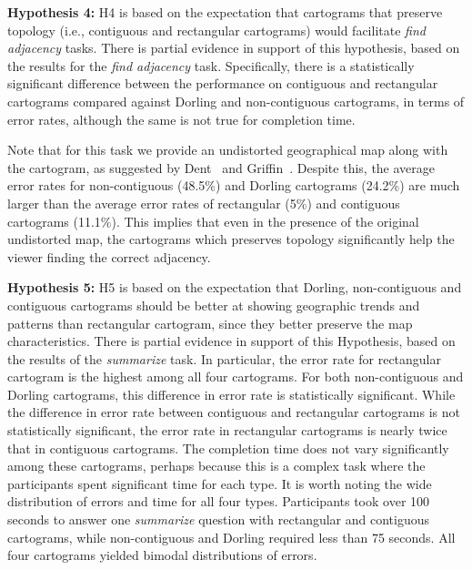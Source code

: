 \documentclass[10pt,journal,compsoc]{IEEEtran}
\begin{document}
\medskip
\noindent
\textbf{Hypothesis 4:}
H4 is based on the expectation that cartograms that preserve topology (i.e., contiguous and rectangular cartograms) would facilitate \textit{find adjacency} tasks. 
There is partial evidence in support of this hypothesis, based on the results for the \textit{find adjacency} task. Specifically, there is a statistically significant difference between the performance on contiguous and rectangular cartograms compared against Dorling and non-contiguous cartograms, in terms of error rates, although the same is not true for completion time. 

Note that for this task we provide an undistorted geographical map along with the cartogram, as suggested by Dent~\cite{dent1975} and Griffin~\cite{Gri83}. Despite this, the average error rates for non-contiguous (48.5\%) and Dorling cartograms (24.2\%) are much larger than the average error rates of rectangular (5\%) and contiguous cartograms (11.1\%). This implies that even in the presence of the original undistorted map, the cartograms which preserves topology significantly help the viewer finding the correct adjacency.




\medskip
\noindent
\textbf{Hypothesis 5:}
H5 is based on the expectation that Dorling, non-contiguous and contiguous cartograms should be better at showing geographic trends and patterns than rectangular cartogram, since they better preserve the map characteristics. There is partial evidence in support of this Hypothesis, based on the results of the \textit{summarize} task. In particular, the error rate for rectangular cartogram is the highest among all four cartograms. For both non-contiguous and Dorling cartograms, this difference in error rate is statistically significant. While the difference in error rate between contiguous and rectangular cartograms is not statistically significant, the error rate in rectangular cartograms is nearly twice that in contiguous cartograms. The completion time does not vary significantly among these cartograms, perhaps because this is a complex task where the participants spent significant time for each type. It is worth noting the wide distribution of errors and time for all four types. Participants took over 100 seconds to answer one \textit{summarize} question with rectangular and contiguous cartograms, while non-contiguous and Dorling required less than 75 seconds. 
All four cartograms yielded bimodal distributions of errors.
\end{document}
